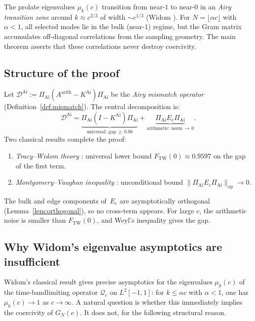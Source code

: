 \documentclass[12pt,a4paper]{amsart}
\theoremstyle{definition}
\newcommand{\KAi}{K^{\mathrm{Ai}}}
\newcommand{\DAi}{\mathcal{D}^{\mathrm{Ai}}}
\newcommand{\PAi}{\Pi_{\mathrm{Ai}}}
\newcommand{\Ec}{E_c}
\newcommand{\norm}[1]{\|#1\|}
\newcommand{\FTW}{F_{\mathrm{TW}}(0)}
\begin{document}
The prolate eigenvalues $\mu_k(c)$ transition from near-$1$ to near-$0$
in an \emph{Airy transition zone} around $k \approx c^{2/3}$ of width
$\sim c^{1/3}$ (Widom \cite{Widom1964}).
For $N = \lfloor\alpha c\rfloor$ with $\alpha < 1$, all selected modes
lie in the bulk (near-$1$) regime, but the Gram matrix accumulates
off-diagonal correlations from the sampling geometry.
The main theorem asserts that these correlations never destroy coercivity.

\subsection{Structure of the proof}

Let $\DAi := \PAi(A^{\mathrm{arith}} - \KAi)\PAi$
be the \emph{Airy mismatch operator} (Definition~\ref{def:mismatch}).
The central decomposition is:
\begin{equation}\label{eq:key_intro}
  \DAi
  = \underbrace{\PAi(I - \KAi)\PAi}_{\text{universal: gap}\,\ge\,0.96}
  + \underbrace{\PAi \Ec \PAi}_{\text{arithmetic: norm}\,\to\,0}.
\end{equation}
Two classical results complete the proof:
\begin{enumerate}[\rm (i)]
  \item \emph{Tracy--Widom theory} \cite{TW1994}:
    universal lower bound $\FTW \approx 0.9597$ on the gap of the first term.
  \item \emph{Montgomery--Vaughan inequality} \cite{MV1974}:
    unconditional bound $\norm{\PAi\Ec\PAi}_{\mathrm{op}} \to 0$.
\end{enumerate}
The bulk and edge components of~$\Ec$ are asymptotically orthogonal
(Lemma~\ref{lem:orthogonal}), so no cross-term appears.
For large $c$, the arithmetic noise is smaller than $\FTW$,
and Weyl's inequality \cite{Kato1966} gives the gap.

\subsection{Why Widom's eigenvalue asymptotics are insufficient}\label{ssec:widom_insufficient}


Widom's classical result \cite{Widom1964} gives precise asymptotics
for the eigenvalues $\mu_k(c)$ of the time-bandlimiting operator
$\mathcal{Q}_c$ on $L^2[-1,1]$: for $k \le \alpha c$ with $\alpha < 1$,
one has $\mu_k(c) \to 1$ as $c \to \infty$.
A natural question is whether this immediately implies the coercivity
of $G_N(c)$.
It does not, for the following structural reason.
\end{document}
